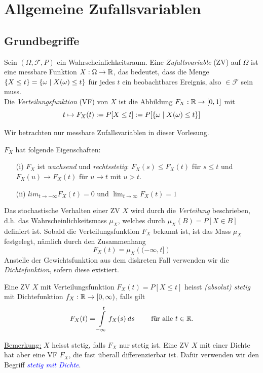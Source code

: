 \section{Allgemeine Zufallsvariablen}

\subsection{Grundbegriffe}
\begin{definition}
Sein $(\Omega,\mathcal{F}, P)$ ein Wahrscheinlichkeitsraum. Eine \textit{Zufallsvariable} (ZV) auf $\Omega$ ist eine messbare Funktion $X:\Omega \to \mathbb{R}$, das bedeutet, dass die Menge $\{X \leq t\} = \{ \omega \;|\; X(\omega) \leq t\}$ für jedes $t$ ein beobachtbares Ereignis, also $\in \mathcal{F}$ sein muss. \\
Die \textit{Verteilungsfunktion} (VF) von $X$ ist die Abbildung $F_X:\mathbb{R}\to [0,1]$ mit
$$ t \mapsto F_X(t) := P[X \leq t] := P[\{ \omega \;|\; X(\omega) \leq t\}]$$
\end{definition}
Wir betrachten nur messbare Zufallsvariablen in dieser Vorlesung.

\begin{satz}
$F_X$ hat folgende Eigenschaften:
\begin{itemize}
\item[(i)] $F_X$ ist \textit{wachsend} und \textit{rechtsstetig}: $F_X(s) \leq F_X(t)$ für $s\leq t$ und $F_X(u) \to F_X(t)$ für $u\to t$ mit $u>t$.
\item[(ii)] $lim_{t\to -\infty} F_X(t) = 0$ und $\lim_{t\to\infty} F_X(t) =1 $
\end{itemize}
\end{satz}

Das stochastische Verhalten einer ZV $X$ wird durch die \textit{Verteilung} beschrieben, d.h. das Wahrscheinlichkeitsmass $\mu_X$, welches durch $\mu_X(B) = P[X\in B]$ definiert ist. Sobald die Verteilungsfunktion $F_X$ bekannt ist, ist das Mass $\mu_X$ festgelegt, nämlich durch den Zusammenhang
$$F_X(t) = \mu_X\left((-\infty, t]\right)$$
Anstelle der Gewichtsfunktion aus dem diskreten Fall verwenden wir die \textit{Dichtefunktion}, sofern diese existiert.

\begin{definition}
Eine ZV $X$ mit Verteilungsfunktion $F_X(t) = P[X \leq t]$ heisst \textit{(absolut) stetig} mit Dichtefunktion $f_X:\mathbb{R}\to [0,\infty)$, falls gilt
$$ F_X(t) = \int \limits_{-\infty}^t f_X(s) \: ds \quad \quad \mbox{ für alle } t \in \mathbb{R}. $$
\end{definition}
\underline{Bemerkung:} $X$ heisst stetig, falls $F_X$ nur stetig ist. Eine ZV $X$ mit einer Dichte hat aber eine VF $F_X$, die fast überall differenzierbar ist. Dafür verwenden wir den Begriff \textit{\textcolor{blue}{stetig mit Dichte}}.

